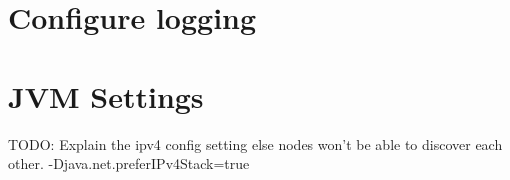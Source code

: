 \section{Configure logging}

\section{JVM Settings}
TODO: Explain the ipv4 config setting else nodes won't be able to discover each other.
-Djava.net.preferIPv4Stack=true
